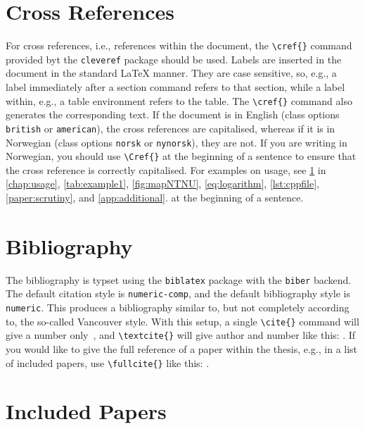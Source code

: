 \section{Cross References}
\label{sec:crossref}

For cross references, i.e., references within the document, the \texttt{\textbackslash cref\{\}} command provided byt the \texttt{cleveref} package should be used. Labels are inserted in the document in the standard \LaTeX{} manner. They are case sensitive, so, e.g., a label immediately after a section command refers to that section, while a label within, e.g., a table environment refers to the table. The \texttt{\textbackslash cref\{\}} command also generates the corresponding text. If the document is in English (class options \texttt{british} or \texttt{american}), the cross references are capitalised, whereas if it is in Norwegian (class options \texttt{norsk} or \texttt{nynorsk}), they are not. If you are writing in Norwegian, you should use \texttt{\textbackslash Cref\{\}} at the beginning of a sentence to ensure that the cross reference is correctly capitalised. For examples on usage, see \cref{sec:crossref} in \cref{chap:usage}, \cref{tab:example1}, \cref{fig:mapNTNU}, \cref{eq:logarithm}, \cref{lst:cppfile}, \cref{paper:scrutiny}, and \cref{app:additional}.  at the beginning of a sentence.

\section{Bibliography}

The bibliography is typset using the \texttt{biblatex} package with the \texttt{biber} backend. The default citation style is \texttt{numeric-comp}, and the default bibliography style is \texttt{numeric}. This produces a bibliography similar to, but not completely according to, the so-called Vancouver style. With this setup, a single \texttt{\textbackslash cite\{\}} command will give a number only~\cite{landes1951scrutiny}, and \texttt{\textbackslash textcite\{\}} will give author and number like this: \textcite{landes1951scrutiny}. If you would like to give the full reference of a paper within the thesis, e.g., in a list of included papers, use \texttt{\textbackslash fullcite\{\}} like this: .

\section{Included Papers}

